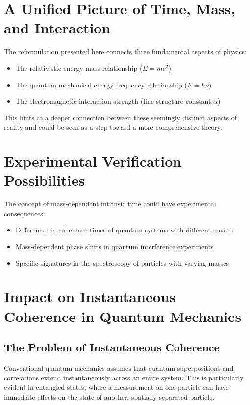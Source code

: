 \documentclass{article}
\begin{document}
	\section{A Unified Picture of Time, Mass, and Interaction}
	
	The reformulation presented here connects three fundamental aspects of physics:
	\begin{itemize}
		\item The relativistic energy-mass relationship ($E = mc^2$)
		\item The quantum mechanical energy-frequency relationship ($E = h\nu$)
		\item The electromagnetic interaction strength (fine-structure constant $\alpha$)
	\end{itemize}
	
	This hints at a deeper connection between these seemingly distinct aspects of reality and could be seen as a step toward a more comprehensive theory.
	
	\section{Experimental Verification Possibilities}
	
	The concept of mass-dependent intrinsic time could have experimental consequences:
	\begin{itemize}
		\item Differences in coherence times of quantum systems with different masses
		\item Mass-dependent phase shifts in quantum interference experiments
		\item Specific signatures in the spectroscopy of particles with varying masses
	\end{itemize}
	
	\section{Impact on Instantaneous Coherence in Quantum Mechanics}
	
	\subsection{The Problem of Instantaneous Coherence}
	
	Conventional quantum mechanics assumes that quantum superpositions and correlations extend instantaneously across an entire system. This is particularly evident in entangled states, where a measurement on one particle can have immediate effects on the state of another, spatially separated particle.
	
\end{document}
